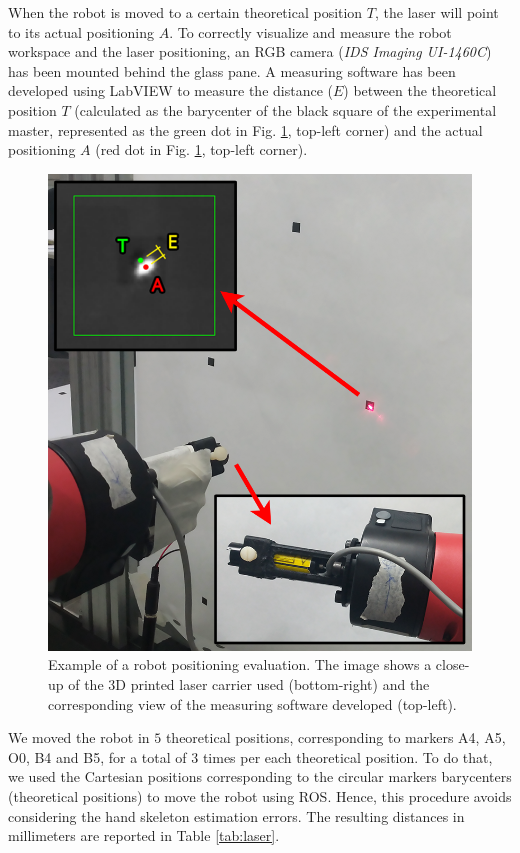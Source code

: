\documentclass[letterpaper, 10 pt, conference]{ieeeconf}  %
\begin{document}
When the robot is moved to a certain theoretical position $T$, the laser will point to its actual positioning $A$. To correctly visualize and measure the robot workspace and the laser positioning, an RGB camera (\textit{IDS Imaging UI-1460C}) has been mounted behind the glass pane.
A measuring software has been developed using LabVIEW to measure the distance ($E$) between the theoretical position $T$ (calculated as the barycenter of the black square of the experimental master, represented as the green dot in Fig. \ref{fig:laser}, top-left corner) and the actual positioning $A$ (red dot in Fig. \ref{fig:laser}, top-left corner).

\begin{figure} [h!]
  \centering
  \includegraphics[width=0.7\columnwidth]{figures/lasermount.png}
  \caption{Example of a robot positioning evaluation. The image shows a close-up of the 3D printed laser carrier used (bottom-right) and the corresponding view of the measuring software developed (top-left).}
  \label{fig:laser}
\end{figure}

We moved the robot in $5$ theoretical positions, corresponding to markers A4, A5, O0, B4 and B5, for a total of $3$ times per each theoretical position. To do that, we used the Cartesian positions corresponding to the circular markers barycenters (theoretical positions) to move the robot using ROS. Hence, this procedure avoids considering the hand skeleton estimation errors.
The resulting distances in millimeters are reported in Table \ref{tab:laser}.
\end{document}
